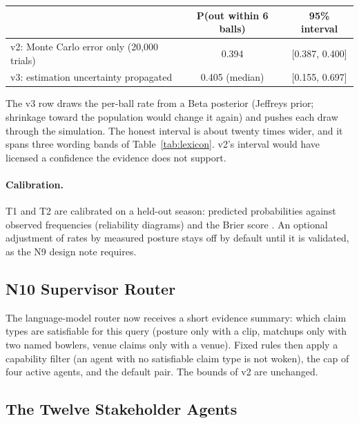 \documentclass[11pt,a4paper]{article}
\begin{document}
\begin{center}
\small
\begin{tabular}{@{}lcc@{}}
\toprule
& \textbf{P(out within 6 balls)} & \textbf{95\% interval} \\
\midrule
v2: Monte Carlo error only (20,000 trials) & 0.394 & [0.387, 0.400] \\
v3: estimation uncertainty propagated & 0.405 (median) & [0.155, 0.697] \\
\bottomrule
\end{tabular}
\end{center}

\noindent The v3 row draws the per-ball rate from a Beta posterior (Jeffreys
prior; shrinkage toward the population would change it again) and pushes each
draw through the simulation. The honest interval is about twenty times wider,
and it spans three wording bands of Table~\ref{tab:lexicon}. v2's interval
would have licensed a confidence the evidence does not support.

\paragraph{Calibration.} T1 and T2 are calibrated on a held-out season:
predicted probabilities against observed frequencies (reliability diagrams) and
the Brier score \cite{brier}. An optional adjustment of rates by measured
posture stays off by default until it is validated, as the N9 design note
requires.

\subsection{N10 Supervisor Router}

The language-model router now receives a short evidence summary: which claim
types are satisfiable for this query (posture only with a clip, matchups only
with two named bowlers, venue claims only with a venue). Fixed rules then apply
a capability filter (an agent with no satisfiable claim type is not woken), the
cap of four active agents, and the default pair. The bounds of v2 are unchanged.

\subsection{The Twelve Stakeholder Agents}
\end{document}
